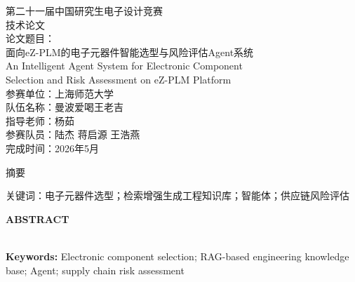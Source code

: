 \documentclass[12pt,a4paper,openany]{ctexrep}
\begin{document}
\begin{titlepage}
\thispagestyle{empty}
\begin{center}
\vspace*{1cm}
{\heitifont{} 第二十一届中国研究生电子设计竞赛}\\[0.6cm]
{\heitifont{} 技术论文}\\[2.5cm]
{\heitifont{} 论文题目：}\\[0.5cm]
{\heitifont{} 面向eZ-PLM的电子元器件智能选型与风险评估Agent系统}\\[0.6cm]
{\heitifont{} An Intelligent Agent System for Electronic Component}\\[0.2cm]
{\heitifont{} Selection and Risk Assessment on eZ-PLM Platform}\\[2.5cm]
{\heitifont{} 参赛单位：上海师范大学}\\[0.8cm]
{\heitifont{} 队伍名称：曼波爱喝王老吉}\\[0.8cm]
{\heitifont{} 指导老师：杨茹}\\[0.8cm]
{\heitifont{} 参赛队员：陆杰 \quad 蒋启源 \quad 王浩燕}\\[0.8cm]
{\heitifont{} 完成时间：2026年5月}\\[2cm]
\end{center}
\end{titlepage}

\newpage
\thispagestyle{empty}
\renewcommand{\contentsname}{\centering\heitifont\zihao{3} 目\quad 录}
\tableofcontents

\newpage
{}\setcounter{page}{1}
\thispagestyle{empty}
\begin{center}
{\heitifont{} 摘\quad 要}
\end{center}

{\heitifont 关键词：}电子元器件选型；检索增强生成工程知识库；智能体；供应链风险评估

\newpage
\thispagestyle{empty}
\begin{center}
{\heitifont{} \textbf{ABSTRACT}}
\end{center}

\\{\bfseries Keywords:} Electronic component selection; RAG-based engineering knowledge base; Agent; supply chain risk assessment
\newpage
{}\setcounter{page}{1}
\end{document}
